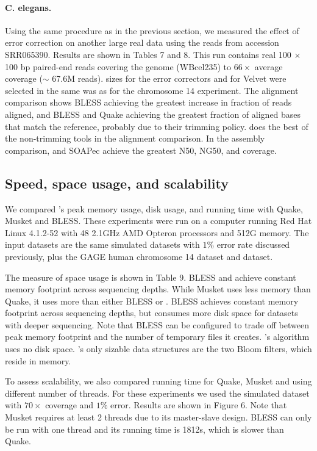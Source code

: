\documentclass{bmcart}
\begin{document}
\paragraph{C. elegans.}
Using the same procedure as in the previous section, we measured the effect of error correction on another large real data using the reads from accession SRR065390. Results are shown in Tables 7 and 8.  This run contains real 100 $\times$ 100 bp paired-end reads covering the \elegans genome (WBcel235) to $66\times$ average coverage ($\sim$ 67.6M reads).  \kmer sizes for the error correctors and for Velvet were selected in the same was as for the chromosome 14 experiment.
The alignment comparison shows BLESS achieving the greatest increase in fraction of reads aligned, and BLESS and Quake achieving the greatest fraction of aligned bases that match the reference, probably due to their trimming policy.  \tool does the best of the non-trimming tools in the alignment comparison.  In the assembly comparison, \tool and SOAPec achieve the greatest N50, NG50, and coverage.

\subsection*{Speed, space usage, and scalability}

We compared \tool's peak memory usage, disk usage, and running time with Quake, Musket and BLESS.  These experiments were run on a computer running Red Hat Linux 4.1.2-52 with 48 2.1GHz AMD Opteron processors and 512G memory.
The input datasets are the same simulated \ecoli datasets with $1\%$ error rate discussed previously, plus the GAGE human chromosome 14 dataset and \elegans dataset.

The measure of space usage is shown in Table 9. BLESS and \tool achieve constant memory footprint across sequencing depths.  While Musket uses less memory than Quake, it uses more than either BLESS or \tool.  BLESS achieves constant memory footprint across sequencing depths, but consumes more disk space for datasets with deeper sequencing.  Note that BLESS can be configured to trade off between peak memory footprint and the number of temporary files it creates.  \tool's algorithm uses no disk space.  \tool's only sizable data structures are the two Bloom filters, which reside in memory.

To assess scalability, we also compared running time for Quake, Musket and \tool using different number of threads.  For these experiments we used the simulated \ecoli dataset with $70\times$ coverage and $1\%$ error.  Results are shown in Figure 6.  Note that Musket requires at least 2 threads due to its master-slave design.  BLESS can only be run with one thread and its running time is 1812s, which is slower than Quake.
\end{document}
